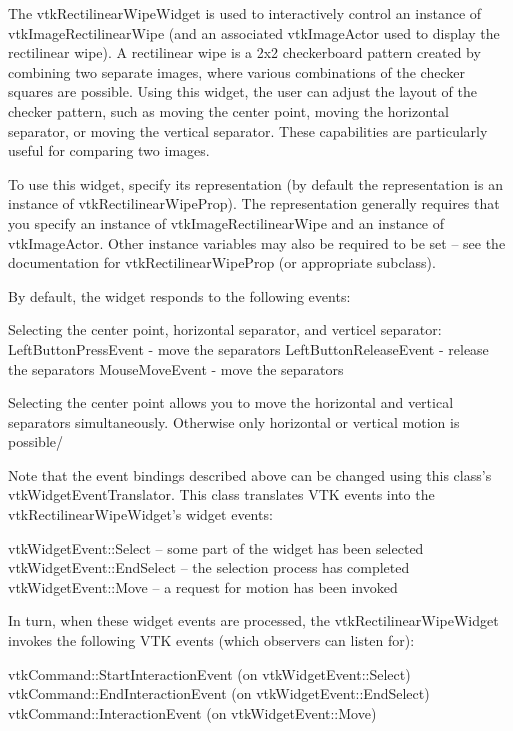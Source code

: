 The vtk\-Rectilinear\-Wipe\-Widget is used to interactively control an instance of vtk\-Image\-Rectilinear\-Wipe (and an associated vtk\-Image\-Actor used to display the rectilinear wipe). A rectilinear wipe is a 2x2 checkerboard pattern created by combining two separate images, where various combinations of the checker squares are possible. Using this widget, the user can adjust the layout of the checker pattern, such as moving the center point, moving the horizontal separator, or moving the vertical separator. These capabilities are particularly useful for comparing two images.

To use this widget, specify its representation (by default the representation is an instance of vtk\-Rectilinear\-Wipe\-Prop). The representation generally requires that you specify an instance of vtk\-Image\-Rectilinear\-Wipe and an instance of vtk\-Image\-Actor. Other instance variables may also be required to be set -- see the documentation for vtk\-Rectilinear\-Wipe\-Prop (or appropriate subclass).

By default, the widget responds to the following events\-: 
\begin{DoxyPre}
 Selecting the center point, horizontal separator, and verticel separator:
   LeftButtonPressEvent - move the separators
   LeftButtonReleaseEvent - release the separators 
   MouseMoveEvent - move the separators
 \end{DoxyPre}
 Selecting the center point allows you to move the horizontal and vertical separators simultaneously. Otherwise only horizontal or vertical motion is possible/

Note that the event bindings described above can be changed using this class's vtk\-Widget\-Event\-Translator. This class translates V\-T\-K events into the vtk\-Rectilinear\-Wipe\-Widget's widget events\-: 
\begin{DoxyPre}
   vtkWidgetEvent::Select -- some part of the widget has been selected
   vtkWidgetEvent::EndSelect -- the selection process has completed
   vtkWidgetEvent::Move -- a request for motion has been invoked
 \end{DoxyPre}


In turn, when these widget events are processed, the vtk\-Rectilinear\-Wipe\-Widget invokes the following V\-T\-K events (which observers can listen for)\-: 
\begin{DoxyPre}
   vtkCommand::StartInteractionEvent (on vtkWidgetEvent::Select)
   vtkCommand::EndInteractionEvent (on vtkWidgetEvent::EndSelect)
   vtkCommand::InteractionEvent (on vtkWidgetEvent::Move)
 \end{DoxyPre}


